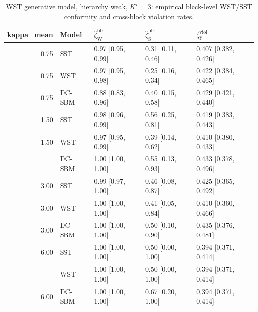 \begin{table}
\centering
\caption{WST generative model, hierarchy weak, $K^\star=3$: empirical block-level WST/SST conformity and cross-block violation rates.}
\centering
\begin{tabular}[t]{rllll}
\toprule
kappa_mean & Model & $\widehat\zeta_{\mathrm{W}}^{\mathrm{blk}}$ & $\widehat\zeta_{\mathrm{S}}^{\mathrm{blk}}$ & $\zeta^{\mathrm{viol}}_{\hat z}$\\
\midrule
0.75 & SST & 0.97 [0.95, 0.99] & 0.31 [0.11, 0.46] & 0.407 [0.382, 0.426]\\
0.75 & WST & 0.97 [0.95, 0.98] & 0.25 [0.16, 0.34] & 0.422 [0.384, 0.465]\\
0.75 & DC-SBM & 0.88 [0.83, 0.96] & 0.40 [0.15, 0.58] & 0.429 [0.421, 0.440]\\
1.50 & SST & 0.98 [0.96, 0.99] & 0.56 [0.25, 0.81] & 0.419 [0.383, 0.443]\\
1.50 & WST & 0.97 [0.95, 0.99] & 0.39 [0.14, 0.62] & 0.410 [0.380, 0.433]\\
\addlinespace
1.50 & DC-SBM & 1.00 [1.00, 1.00] & 0.55 [0.13, 0.93] & 0.433 [0.378, 0.496]\\
3.00 & SST & 0.99 [0.97, 1.00] & 0.46 [0.08, 0.87] & 0.425 [0.365, 0.492]\\
3.00 & WST & 1.00 [1.00, 1.00] & 0.41 [0.05, 0.84] & 0.410 [0.360, 0.466]\\
3.00 & DC-SBM & 1.00 [1.00, 1.00] & 0.50 [0.10, 0.90] & 0.435 [0.376, 0.481]\\
6.00 & SST & 1.00 [1.00, 1.00] & 0.50 [0.00, 1.00] & 0.394 [0.371, 0.414]\\
\addlinespace
6.00 & WST & 1.00 [1.00, 1.00] & 0.50 [0.00, 1.00] & 0.394 [0.371, 0.414]\\
6.00 & DC-SBM & 1.00 [1.00, 1.00] & 0.67 [0.20, 1.00] & 0.394 [0.371, 0.414]\\
\bottomrule
\end{tabular}
\end{table}
